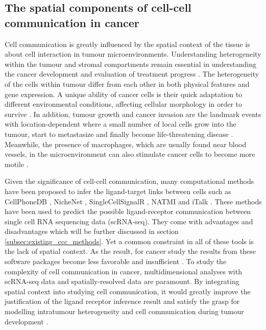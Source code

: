 \subsection{The spatial components of cell-cell communication in cancer}
Cell communication is greatly influenced by the spatial context of the tissue is about cell interaction in tumour microenvironments. Understanding heterogeneity within the tumour and stromal compartments remain essential in understanding the cancer development and evaluation of treatment progress \cite{pages2010immune}. The heterogeneity of the cells within tumour differ from each other in both physical features and gene expression. A unique ability of cancer cells is their quick adaptation to different environmental conditions, affecting cellular morphology in order to survive \cite{clark2015modes}. In addition, tumour growth and cancer invasion are the landmark events with location-dependent where a small number of local cells  grow into the tumour, start to metastasize and finally become life-threatening disease \cite{friedl2011cancer}. 
Meanwhile, the presence of macrophages, which are usually found near blood vessels, in the microenvironment can also stimulate cancer cells to become more motile \cite{wyckoff2007direct}.  

Given the significance of cell-cell communication, many computational methods have been proposed to infer the ligand-target links between cells such as CellPhoneDB \cite{efremova2020cellphonedb}, NicheNet \cite{browaeys2020nichenet}, SingleCellSignalR \cite{cabello2020singlecellsignalr}, NATMI \cite{hou2020predicting} and iTalk \cite{wang2019italk}. These methods have been  used to predict the possible ligand-receptor communication between single cell RNA sequencing data (scRNA-seq). They come with advantages and disadvantages which will be further discussed in section \ref{subsec:existing_ccc_methods}. Yet a common constraint in all of these tools is the lack of spatial context. As the result, for cancer study the results from these software packages become less favorable and insufficient \cite{de2020unraveling}. To study the complexity of cell communication in cancer, multidimensional analyses with scRNA-seq data and spatially-resolved data are paramount. By integrating spatial context into studying cell communication, it would greatly improve the justification of the ligand receptor inference result and satisfy the grasp for modelling intratumour heterogeneity and cell communication during tumour development \cite{crosetto2015spatially, pages2010immune, marusyk2012intra,bedard2013tumour}.


